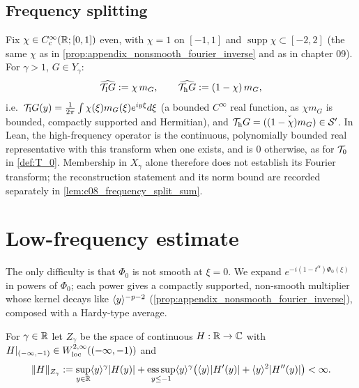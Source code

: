 \subsection{Frequency splitting}

\begin{definition}
  \label{def:c08_frequency_split}
  Fix $\chi\in C_c^\infty(\mathbb{R};[0,1])$ even, with $\chi=1$ on $[-1,1]$ and $\operatorname{supp}\chi\subset[-2,2]$ (the same $\chi$ as in
  \cref{prop:appendix_nonsmooth_fourier_inverse} and as in chapter 09). For $\gamma>1$, $G\in Y_\gamma$:
  \begin{equation}\label{eqn:linear_frequency_split}
    \widehat{\mathcal{T}_{\rm l}G}:=\chi\,m_G,\qquad \widehat{\mathcal{T}_{\rm h}G}:=(1-\chi)\,m_G,
  \end{equation}
  i.e.\ $\mathcal{T}_{\rm l}G(y)=\frac1{2\pi}\int\chi(\xi)m_G(\xi)e^{iy\xi}d\xi$ (a bounded $C^\infty$ real function, as $\chi m_G$ is bounded,
  compactly supported and Hermitian), and $\mathcal{T}_{\rm h}G=\check{((1-\chi)m_G)}\in\mathcal S'$.
  In Lean, the high-frequency operator is the continuous, polynomially bounded real representative
  with this transform when one exists, and is $0$ otherwise, as for $\mathcal{T}_0$ in \cref{def:T_0}.
  Membership in $X_\gamma$ alone therefore does not establish its Fourier transform; the reconstruction
  statement and its norm bound are recorded separately in \cref{lem:c08_frequency_split_sum}.
\end{definition}

\section{Low-frequency estimate}

The only difficulty is that $\Phi_0$ is not smooth at $\xi=0$. We expand $e^{-i(1-t^\alpha)\Phi_0(\xi)}$ in powers of
$\Phi_0$; each power gives a compactly supported, non-smooth multiplier whose kernel decays like
$\langle y \rangle^{-p-2}$ (\cref{prop:appendix_nonsmooth_fourier_inverse}), composed with a Hardy-type average.

\begin{definition}
  \label{def:c08_Z_gamma}
  For $\gamma\in\mathbb{R}$ let $Z_\gamma$ be the space of continuous $H:\mathbb{R}\to\mathbb{C}$ with $H|_{(-\infty,-1)}\in W^{2,\infty}_{\rm loc}((-\infty,-1))$ and
  \[
    \|H\|_{Z_\gamma}:=\sup_{y\in\mathbb{R}}\langle y \rangle^\gamma|H(y)|+\operatorname*{ess\,sup}_{y\le-1}\langle y \rangle^\gamma\bigl(\langle y \rangle|H'(y)|+\langle y \rangle^2|H''(y)|\bigr)<\infty.
  \]
\end{definition}

